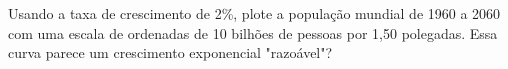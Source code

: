 Usando a taxa de crescimento de 2\%, plote a população mundial de 1960 a 2060 com uma escala de ordenadas de 10 bilhões de pessoas por 1,50 polegadas. Essa curva parece um crescimento exponencial "razoável"?
